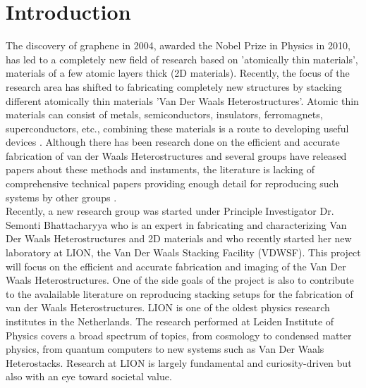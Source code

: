 \documentclass[10pt]{article}
\begin{document}
\section{Introduction}
The discovery of graphene in 2004, awarded the Nobel Prize in Physics in 2010, has led to a completely new field of research based on 'atomically thin materials', materials of a few atomic layers thick (2D materials). 
Recently, the focus of the research area has shifted to fabricating completely new structures by stacking different atomically thin materials 'Van Der Waals Heterostructures'. 
Atomic thin materials can consist of metals, semiconductors, insulators, ferromagnets, superconductors, etc., combining these materials is a route to developing useful devices \cite{geimVanWaalsHeterostructures2013}.
Although there has been research done on the efficient and accurate fabrication of van der Waals Heterostructures and several groups have released papers about these methods and instuments, the literature is lacking of comprehensive technical papers providing enough detail for reproducing such systems by other groups \cite{gantSystemDeterministicTransfer2020,castellanos-gomezDeterministicTransferTwodimensional2014}.\\

Recently, a new research group was started under Principle Investigator Dr. Semonti Bhattacharyya who is an expert in fabricating and characterizing Van Der Waals Heterostructures and 2D materials and who recently started her new laboratory at LION, the Van Der Waals Stacking Facility (VDWSF).
This project will focus on the efficient and accurate fabrication and imaging of the Van Der Waals Heterostructures.
One of the side goals of the project is also to contribute to the avalailable literature on reproducing stacking setups for the fabrication of van der Waals Heterostructures.
LION is one of the oldest physics research institutes in the Netherlands. 
The research performed at Leiden Institute of Physics covers a broad spectrum of topics, from cosmology to condensed matter physics, from quantum computers to new systems such as Van Der Waals Heterostacks.
Research at LION is largely fundamental and curiosity-driven but also with an eye toward societal value. \\



\clearpage
\end{document}

